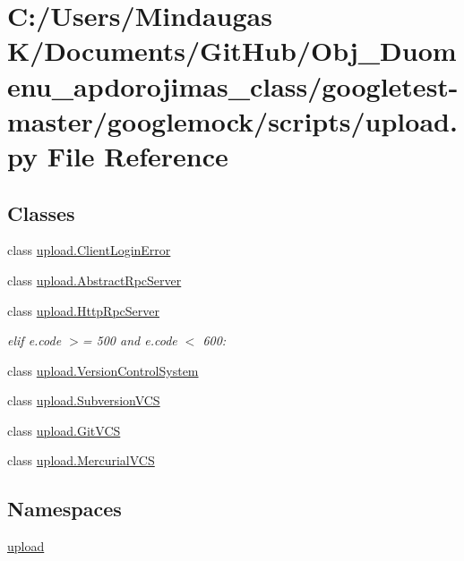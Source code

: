 \hypertarget{googletest-master_2googlemock_2scripts_2upload_8py}{}\section{C\+:/\+Users/\+Mindaugas K/\+Documents/\+Git\+Hub/\+Obj\+\_\+\+Duomenu\+\_\+apdorojimas\+\_\+class/googletest-\/master/googlemock/scripts/upload.py File Reference}
\label{googletest-master_2googlemock_2scripts_2upload_8py}
\subsection*{Classes}
\begin{DoxyCompactItemize}
\item 
class \mbox{\hyperlink{classupload_1_1_client_login_error}{upload.\+Client\+Login\+Error}}
\item 
class \mbox{\hyperlink{classupload_1_1_abstract_rpc_server}{upload.\+Abstract\+Rpc\+Server}}
\item 
class \mbox{\hyperlink{classupload_1_1_http_rpc_server}{upload.\+Http\+Rpc\+Server}}
\begin{DoxyCompactList}\small\item\em elif e.\+code $>$= 500 and e.\+code $<$ 600\+: \end{DoxyCompactList}\item 
class \mbox{\hyperlink{classupload_1_1_version_control_system}{upload.\+Version\+Control\+System}}
\item 
class \mbox{\hyperlink{classupload_1_1_subversion_v_c_s}{upload.\+Subversion\+V\+CS}}
\item 
class \mbox{\hyperlink{classupload_1_1_git_v_c_s}{upload.\+Git\+V\+CS}}
\item 
class \mbox{\hyperlink{classupload_1_1_mercurial_v_c_s}{upload.\+Mercurial\+V\+CS}}
\end{DoxyCompactItemize}
\subsection*{Namespaces}
\begin{DoxyCompactItemize}
\item 
 \mbox{\hyperlink{namespaceupload}{upload}}
\end{DoxyCompactItemize}
